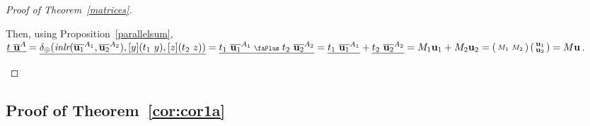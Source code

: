 \documentclass[screen, sigconf,authorversion,nonacm]{acmart}
\theoremstyle{acmdefinition}
\numberwithin{equation}{section}
\newcommand\abstr[1]{[#1]}
\newcommand\inlr{\mbox{\it inlr}}
\newcommand\plus{\mathrel{\text{\normalfont\scalebox{0.7}{\faPlus}}}}
\newcommand\elimplus{\delta_{\oplus}}
\begin{document}
\begin{proof}[Proof of Theorem~\ref{matrices}]
\begin{itemize}
      Then, using Proposition~\ref{parallelsum}, $\underline{t~\overline{\bf
      u}^A} = \underline{\elimplus(\inlr(\overline{{\bf
	  u}_1}^{A_1},\overline{{\bf u}_2}^{A_2}), \abstr{y} (t_1~y),
      \abstr{z} (t_2~z))}
      = \underline{t_1~\overline{{\bf u}_1}^{A_1} \plus t_2~\overline{{\bf u}_2}^{A_2}}
      = \underline{t_1~\overline{{\bf u}_1}^{A_1}} + \underline{t_2~\overline{{\bf u}_2}^{A_2}}
      = M_1 {\bf u}_1 + M_2 {\bf u}_2
      = \left(\begin{smallmatrix} M_1 & M_2 \end{smallmatrix}\right)
      \left(\begin{smallmatrix} {\bf u}_1 \\ {\bf u}_2  \end{smallmatrix}\right)
      = M {\bf u}$.
      \qedhere
  \end{itemize}
\end{proof}

\subsection{Proof of Theorem~\ref{cor:cor1a}}
\end{document}
